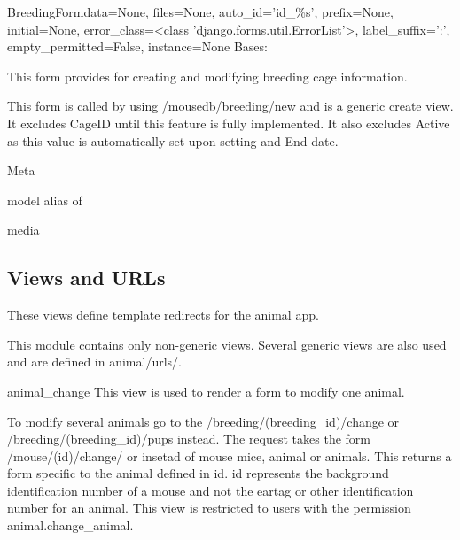 \documentclass[letterpaper,10pt,english]{sphinxmanual}
\begin{document}
\hypertarget{animal.forms.BreedingForm}{}\begin{classdesc}{BreedingForm}{data=None, files=None, auto\_id='id\_\%s', prefix=None, initial=None, error\_class=\textless{}class 'django.forms.util.ErrorList'\textgreater{}, label\_suffix=':', empty\_permitted=False, instance=None}
Bases: 

This form provides for creating and modifying breeding cage information.

This form is called by using /mousedb/breeding/new and is a generic create view.  It excludes CageID until this feature is fully implemented.  It also excludes Active as this value is automatically set upon setting and End date.

\hypertarget{animal.forms.BreedingForm.Meta}{}\begin{classdesc}{Meta}{}~

\hypertarget{animal.forms.BreedingForm.Meta.model}{}\begin{memberdesc}{model}
alias of 
\end{memberdesc}
\end{classdesc}

\hypertarget{animal.forms.BreedingForm.media}{}\begin{memberdesc}[BreedingForm]{media}\end{memberdesc}
\end{classdesc}


\subsection{Views and URLs}
\hypertarget{module-animal.views}{}
\modulesynopsis{}
These views define template redirects for the animal app.

This module contains only non-generic views.  Several generic views are also used and are defined in animal/urls/.

\hypertarget{animal.views.animal\_change}{}\begin{memberdesc}{animal\_change}
This view is used to render a form to modify one animal.

To modify several animals go to the /breeding/(breeding\_id)/change or /breeding/(breeding\_id)/pups instead.
The request takes the form /mouse/(id)/change/ or insetad of mouse mice, animal or animals.  This returns a form specific to the animal defined in id.  id represents the background identification number of a mouse and not the eartag or other identification number for an animal.
This view is restricted to users with the permission animal.change\_animal.
\end{memberdesc}
\end{document}
